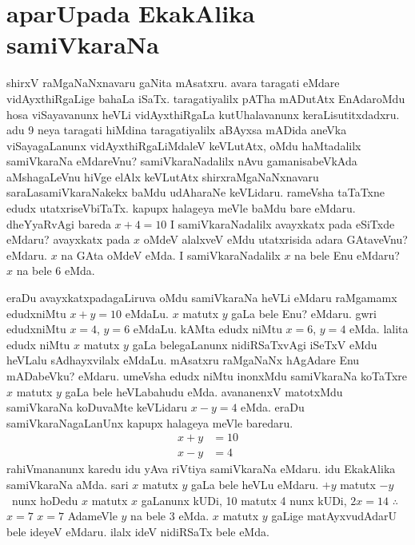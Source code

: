 \chapter{aparUpada EkakAlika samiVkaraNa}

shirxV raMgaNaNxnavaru gaNita mAsatxru. avara taragati eMdare vidAyxthiRgaLige bahaLa iSaTx. taragatiyalilx pATha mADutAtx EnAdaroMdu hosa viSayavanunx heVLi vidAyxthiRgaLa kutUhalavanunx keraLisutitxdadxru. adu {\rm 9} neya taragati hiMdina taragatiyalilx aBAyxsa mADida aneVka viSayagaLanunx vidAyxthiRgaLiMdaleV keVLutAtx, oMdu haMtadalilx samiVkaraNa eMdareVnu? samiVkaraNadalilx nAvu gamanisabeVkAda aMshagaLeVnu hiVge elAlx keVLutAtx shirxraMgaNaNxnavaru saraLasamiVkaraNakekx baMdu udAharaNe keVLidaru. rameVsha taTaTxne edudx utatxriseVbiTaTx. kapupx halageya meVle baMdu bare eMdaru. dheYyaRvAgi bareda \quad $x+4=10$ \quad I samiVkaraNadalilx avayxkatx pada eSiTxde eMdaru? avayxkatx pada $x$ oMdeV alalxveV eMdu utatxrisida adara GAtaveVnu? eMdaru. $x$ na GAta oMdeV eMda. I samiVkaraNadalilx $x$ na bele Enu eMdaru? $x$ na bele {\rm 6} eMda.

eraDu avayxkatxpadagaLiruva oMdu samiVkaraNa heVLi eMdaru raMgamamx edudxniMtu \quad $x+y=10$ \quad eMdaLu. $x$ matutx $y$ gaLa bele Enu? eMdaru. gwri edudxniMtu \quad $x=4$, \quad $y=6$ \quad eMdaLu. kAMta edudx niMtu \quad $x=6$, \quad $y=4$ \quad eMda. lalita edudx niMtu $x$ matutx $y$ gaLa belegaLanunx nidiRSaTxvAgi iSeTxV eMdu heVLalu sAdhayxvilalx eMdaLu. mAsatxru raMgaNaNx hAgAdare Enu mADabeVku? eMdaru. umeVsha edudx niMtu inonxMdu samiVkaraNa koTaTxre $x$ matutx $y$ gaLa bele heVLabahudu eMda. avananenxV matotxMdu samiVkaraNa koDuvaMte keVLidaru \quad $x-y=4$ \quad eMda. eraDu samiVkaraNagaLanUnx kapupx halageya meVle baredaru.
\begin{align*}
x+y &=10\\
x-y &=4
\end{align*}
rahiVmananunx karedu idu yAva riVtiya samiVkaraNa eMdaru. idu EkakAlika samiVkaraNa aMda. sari $x$ matutx $y$ gaLa bele heVLu eMdaru. $+y$ \quad matutx \quad $-y$~nunx hoDedu $x$ matutx $x$ gaLanunx kUDi, {\rm 10} matutx {\rm 4} nunx kUDi, \quad $2x=14$ \quad $\therefore$ $x=7$ \quad $x=7$ \quad AdameVle $y$ na bele {\rm 3} eMda. $x$ matutx $y$ gaLige matAyxvudAdarU bele ideyeV eMdaru. ilalx ideV nidiRSaTx bele eMda.

